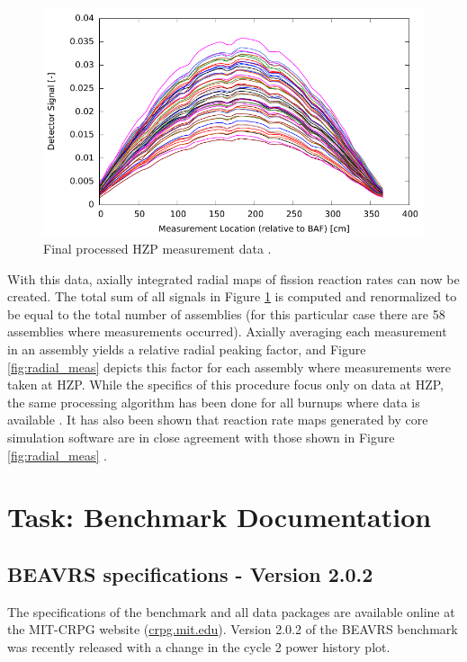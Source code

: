 \documentclass{article}
\begin{document}
\begin{figure}[!htb]
    \centering
    \includegraphics[width=4.5in]{figures/spline_unnorm.pdf}
    \caption{Final processed HZP measurement data \cite{beavrs}. \label{fig:splineunnorm}}
\end{figure}

With this data, axially integrated radial maps of fission reaction rates can now be created. The total sum of all signals in Figure \ref{fig:splineunnorm} is computed and renormalized to be equal to the total number of assemblies (for this particular case there are 58 assemblies where measurements occurred). Axially averaging each measurement in an assembly yields a relative radial peaking factor, and Figure \ref{fig:radial_meas} depicts this factor for each assembly where measurements were taken at HZP. While the specifics of this procedure focus only on data at HZP, the same processing algorithm has been done for all burnups where data is available \cite{beavrs}. It has also been shown that reaction rate maps generated by core simulation software are in close agreement with those shown in Figure \ref{fig:radial_meas} \cite{horelik2013}. 



\section{Task: Benchmark Documentation}

\subsection{BEAVRS specifications - Version 2.0.2}
The specifications of the benchmark and all data packages are available online at the MIT-CRPG website (\url{crpg.mit.edu}). Version 2.0.2 of the BEAVRS benchmark was recently released with a change in the cycle 2 power history plot.
\end{document}

